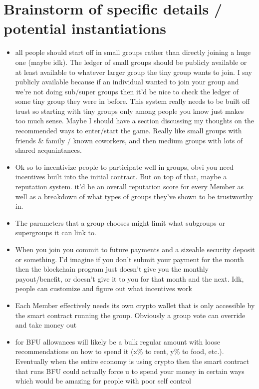 \documentclass{article}[10pt]
\begin{document}
\section{Brainstorm of specific details / potential instantiations}
\label{section:Brainstorm}
\begin{itemize}
    \item all people should start off in small groups rather than directly joining a huge one (maybe idk). 
    The ledger of small groups should be publicly available or at least available to whatever larger group the tiny group wants to join. 
    I say publicly available because if an individual wanted to join your group and we’re not doing sub/super groups then it’d be nice to check the ledger of some tiny group they were in before. 
    This system really needs to be built off trust so starting with tiny groups only among people you know just makes too much sense. 
    Maybe I should have a section discussing my thoughts on the recommended ways to enter/start the game. 
    Really like small groups with friends \& family / known coworkers, and then medium groups with lots of shared acquaintances.
    
    \item Ok so to incentivize people to participate well in groups, obvi you need incentives built into the initial contract. 
    But on top of that, maybe a reputation system. 
    it’d be an overall reputation score for every Member as well as a breakdown of what types of groups they’ve shown to be trustworthy in.
    
    \item The parameters that a group chooses might limit what subgroups or supergroups it can link to.
    
    \item When you join you commit to future payments and a sizeable security deposit or something. 
    I'd imagine if you don't submit your payment for the month then the blockchain program just doesn't give you the monthly payout/benefit, or doesn't give it to you for that month and the next.
    Idk, people can customize and figure out what incentives work
    
    \item Each Member effectively needs its own crypto wallet that is only accessible by the smart contract running the group. Obviously a group vote can override and take money out
    
    \item for BFU allowances will likely be a bulk regular amount with loose recommendations on how to spend it (x\% to rent, y\% to food, etc.).
    Eventually when the entire economy is using crypto then the smart contract that runs BFU could actually force u to spend your money in certain ways which would be amazing for people with poor self control
    

\end{itemize}
\end{document}
